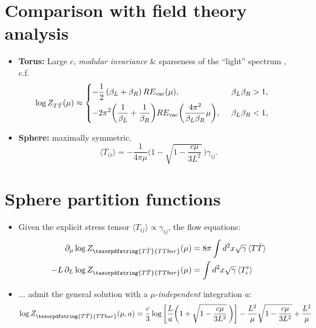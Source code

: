 \documentclass[11pt]{article}
\renewenvironment{frame}[1]%
	{\section*{#1}}%
	{}
\newcommand{\TTbar}{\texorpdfstring{\ensuremath{T\bar{T}}}{TTbar}\xspace}
\begin{document}
\begin{multicols}{3}
\begin{frame}{Comparison with field theory analysis}{%
	\textcite{Datta:2018thy,Apolo:2023aho}
}
\begin{itemize}
\item \textbf{Torus:} Large $c$, \textit{modular invariance} \& sparseness of the ``light'' spectrum \cite{Datta:2018thy,Apolo:2023aho},
	c.f. \textcite{Hartman:2014oaa}
	\begin{equation*}
	\hspace{-1.5em}
		\log   Z_{T\bar T}(\mu)  \approx \left\{ \begin{aligned}
		& {-\frac{1}{2}}\,(\beta_L + \beta_R)\, RE_{\text{vac}}(\mu),  &\beta_L \beta_R > 1, \\
		& {-2 \pi^2 \bigg(\frac{1}{\beta_L} + \frac{1}{\beta_R}\bigg)  RE_{\text{vac}}\bigg(\frac{4\pi^2}{\beta_L \beta_R} \mu \bigg)}, \ \, &\beta_L\beta_R < 1, %
		 \end{aligned} \right. %
	\end{equation*}
	
\item \textbf{Sphere:} maximally symmetric, \textcite{Donnelly:2018bef}
	\begin{equation}
		\langle T_{ij}\rangle =-\frac{1}{4\pi\mu} \bigg(1-\sqrt{1-\frac{c\mu}{3L^2}}\, \bigg)  \gamma_{ij}.
	\end{equation}
\end{itemize}
\end{frame}

\begin{frame}{Sphere partition functions}{%
	\textcite{Donnelly:2018bef,Li:2020zjb}
}

\begin{itemize}

\item Given the explicit stress tensor $\langle T_{ij}\rangle \propto \gamma_{ij}$, the flow equations:
	\begin{align*}
\partial_\mu \log Z_{\TTbar}(\mu)&=8\pi \int d^2x\sqrt{\gamma}\, \langle T\bar{T} \rangle \\
-L\,\partial_L \log Z_{\TTbar}(\mu)&=\int d^2x\sqrt{\gamma}\,\langle T^i_i \rangle
	\end{align*}

	\item ... admit the general solution with a $\mu$-\textit{independent} integration $a$:
	\begin{equation*}
		\log Z_{\TTbar}(\mu, a) = \frac{c}{3} \log \bigg[\frac{L}{a}   \bigg(1+\sqrt{1-\frac{c \mu }{3  L^2}}\, \bigg) \bigg] - \frac{L^2}{\mu}  \sqrt{1-\frac{c \mu }{3 L^2}} + \frac{L^2}{\mu} %
	\end{equation*}


\end{itemize}
\end{frame}
\end{multicols}
\end{document}
